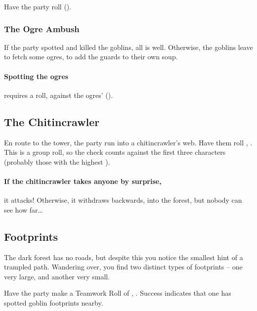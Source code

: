 \begin{multicols}{2}
Have the party roll  (\tn[10]).

\subsubsection{The Ogre Ambush}

If the party spotted and killed the goblins, all is well.
Otherwise, the goblins leave to fetch some ogres, to add the guards to their own soup.

\randomfour

\ogre

\paragraph{Spotting the ogres}
requires a  roll, against the ogres'  (\tn).

\subsection{The Chitincrawler}

En route to the tower, the party run into a chitincrawler's web.
Have them roll , \tn[10].
This is a group roll, so the check counts against the first three characters (probably those with the highest ).

\chitincrawler

\paragraph{If the chitincrawler takes anyone by surprise,}
it attacks!
Otherwise, it withdraws backwards, into the forest, but nobody can see how far\ldots

\subsection{Footprints}

\begin{boxtext}
  The dark forest has no roads, but despite this you notice the smallest hint of a trampled path.
  Wandering over, you find two distinct types of footprints -- one very large, and another very small.
\end{boxtext}

\noindent
Have the party make a Teamwork Roll of , \tn[10].
Success indicates that one has spotted goblin footprints nearby.


\end{multicols}
